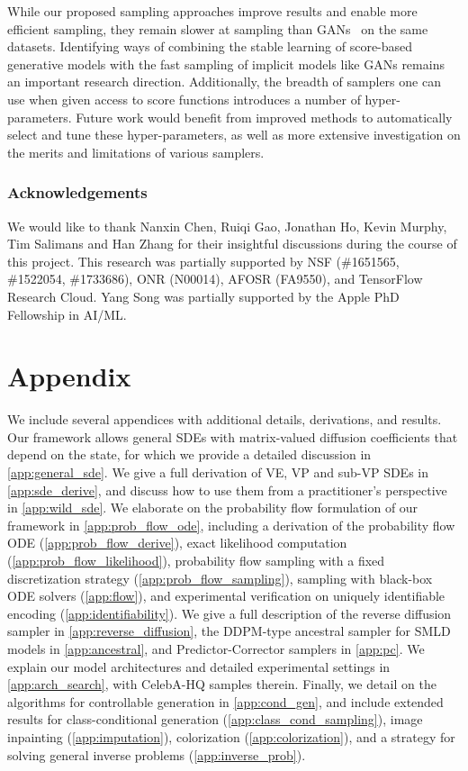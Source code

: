 \documentclass{article} \usepackage{iclr2021_conference,times}
\begin{document}
While our proposed sampling approaches improve results and enable more efficient sampling, they remain slower at sampling than GANs~\citep{goodfellow2014generative} on the same datasets. Identifying ways of combining the stable learning of score-based generative models with the fast sampling of implicit models like GANs remains an important research direction. Additionally, the breadth of samplers one can use when given access to score functions introduces a number of hyper-parameters. Future work would benefit from improved methods to automatically select and tune these hyper-parameters, as well as more extensive investigation on the merits and limitations of various samplers.

\subsubsection*{Acknowledgements}
We would like to thank Nanxin Chen, Ruiqi Gao, Jonathan Ho, Kevin Murphy, Tim Salimans and Han Zhang for their insightful discussions during the course of this project. This research was partially supported by NSF (\#1651565, \#1522054, \#1733686),
ONR (N00014), AFOSR (FA9550), and TensorFlow Research Cloud. Yang Song was partially supported by the Apple PhD Fellowship in AI/ML. 


\appendix
\newpage
\section*{Appendix}
We include several appendices with additional details, derivations, and results.
Our framework allows general SDEs with matrix-valued diffusion coefficients that depend on the state, for which we provide a detailed discussion in \cref{app:general_sde}. We give a full derivation of VE, VP and sub-VP SDEs in \cref{app:sde_derive}, and discuss how to use them from a practitioner's perspective in \cref{app:wild_sde}. We elaborate on the probability flow formulation of our framework in \cref{app:prob_flow_ode}, including a derivation of the probability flow ODE (\cref{app:prob_flow_derive}), exact likelihood computation (\cref{app:prob_flow_likelihood}), probability flow sampling with a fixed discretization strategy (\cref{app:prob_flow_sampling}), sampling with black-box ODE solvers (\cref{app:flow}), and experimental verification on uniquely identifiable encoding (\cref{app:identifiability}). We give a full description of the reverse diffusion sampler in \cref{app:reverse_diffusion}, the DDPM-type ancestral sampler for SMLD models in \cref{app:ancestral}, and Predictor-Corrector samplers in \cref{app:pc}. We explain our model architectures and detailed experimental settings in \cref{app:arch_search}, with  CelebA-HQ samples therein. Finally, we detail on the algorithms for controllable generation in \cref{app:cond_gen}, and include extended results for class-conditional generation (\cref{app:class_cond_sampling}), image inpainting (\cref{app:imputation}), colorization (\cref{app:colorization}), and a strategy for solving general inverse problems (\cref{app:inverse_prob}).
\end{document}
